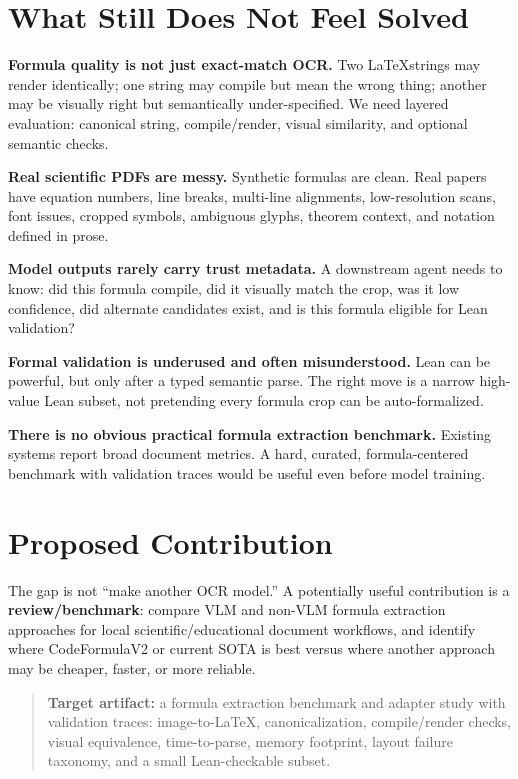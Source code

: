 \documentclass[10pt]{article}
\begin{document}
\section{What Still Does Not Feel Solved}

\textbf{Formula quality is not just exact-match OCR.} Two \LaTeX strings may render identically; one string may compile but mean the wrong thing; another may be visually right but semantically under-specified. We need layered evaluation: canonical string, compile/render, visual similarity, and optional semantic checks.

\textbf{Real scientific PDFs are messy.} Synthetic formulas are clean. Real papers have equation numbers, line breaks, multi-line alignments, low-resolution scans, font issues, cropped symbols, ambiguous glyphs, theorem context, and notation defined in prose.

\textbf{Model outputs rarely carry trust metadata.} A downstream agent needs to know: did this formula compile, did it visually match the crop, was it low confidence, did alternate candidates exist, and is this formula eligible for Lean validation?

\textbf{Formal validation is underused and often misunderstood.} Lean can be powerful, but only after a typed semantic parse. The right move is a narrow high-value Lean subset, not pretending every formula crop can be auto-formalized.

\textbf{There is no obvious practical formula extraction benchmark.} Existing systems report broad document metrics. A hard, curated, formula-centered benchmark with validation traces would be useful even before model training.

\section{Proposed Contribution}

The gap is not ``make another OCR model.'' A potentially useful contribution is a \textbf{review/benchmark}: compare VLM and non-VLM formula extraction approaches for local scientific/educational document workflows, and identify where CodeFormulaV2 or current SOTA is best versus where another approach may be cheaper, faster, or more reliable.

\begin{quote}
\textbf{Target artifact:} a formula extraction benchmark and adapter study with validation traces: image-to-\LaTeX, canonicalization, compile/render checks, visual equivalence, time-to-parse, memory footprint, layout failure taxonomy, and a small Lean-checkable subset.
\end{quote}
\end{document}
